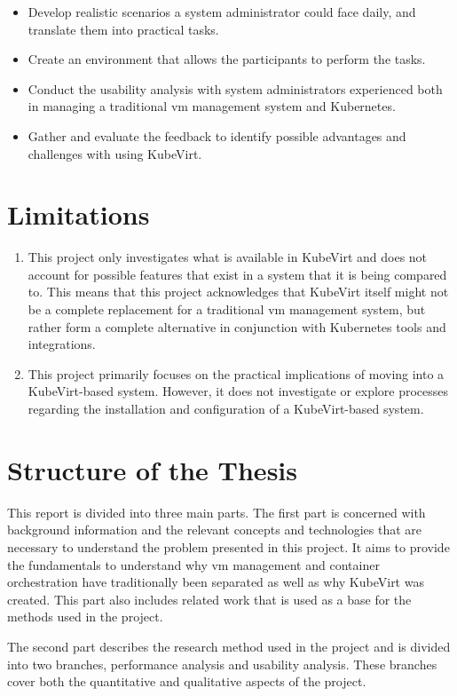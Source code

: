 \documentclass{kththesis}
\begin{document}
\begin{itemize}
    \item Develop realistic scenarios a system administrator could face daily, and translate them into practical tasks.
    \item Create an environment that allows the participants to perform the tasks.
    \item Conduct the usability analysis with system administrators experienced both in managing a traditional \Gls{vm} management system and Kubernetes. 
    \item Gather and evaluate the feedback to identify possible advantages and challenges with using KubeVirt. 
\end{itemize}

\section{Limitations}
\begin{enumerate}
    \item This project only investigates what is available in KubeVirt and does not account for possible features that exist in a system that it is being compared to. This means that this project acknowledges that KubeVirt itself might not be a complete replacement for a traditional \Gls{vm} management system, but rather form a complete alternative in conjunction with Kubernetes tools and integrations.
    \item This project primarily focuses on the practical implications of moving into a KubeVirt-based system. However, it does not investigate or explore processes regarding the installation and configuration of a KubeVirt-based system.
\end{enumerate}

\section{Structure of the Thesis}
This report is divided into three main parts. The first part is concerned with background information and the relevant concepts and technologies that are necessary to understand the problem presented in this project. It aims to provide the fundamentals to understand why \Gls{vm} management and container orchestration have traditionally been separated as well as why KubeVirt was created. This part also includes related work that is used as a base for the methods used in the project. 

The second part describes the research method used in the project and is divided into two branches, performance analysis and usability analysis. These branches cover both the quantitative and qualitative aspects of the project. 
\end{document}
